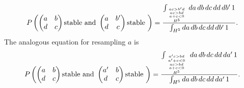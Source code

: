 \documentclass{amsart}
\theoremstyle{definition}
\theoremstyle{remark}
\numberwithin{equation}{section}
\begin{document}
\begin{align*}
P\left(\begin{pmatrix}
a & b \\
d & c
\end{pmatrix} \textrm{stable and } \begin{pmatrix}
a & b' \\
d & c
\end{pmatrix} \textrm{stable } \right) = \frac{\int_{{{ac>b'd \atop ac>bd} \atop a+c<0} \atop H^5} da\,db\,dc\,dd\,db'\,1}{\int_{H^5} da\,db\,dc\,dd\,db'\,1}.
\end{align*}
The analogous equation for resampling $a$ is
\begin{align*}
P\left(\begin{pmatrix}
a & b \\
d & c
\end{pmatrix} \textrm{stable and } \begin{pmatrix}
a' & b \\
d & c
\end{pmatrix} \textrm{stable } \right) = \frac{\int_{{{{a'c>bd \atop a' + c < 0} \atop ac>bd} \atop a+c<0} \atop H^5} da\,db\,dc\,dd\,da'\,1}{\int_{H^5} da\,db\,dc\,dd\,da'\,1}.
\end{align*}

\newcommand{\specialcell}[2][c]{%
  \begin{tabular}[#1]{@{}c@{}}#2\end{tabular}}
\end{document}
